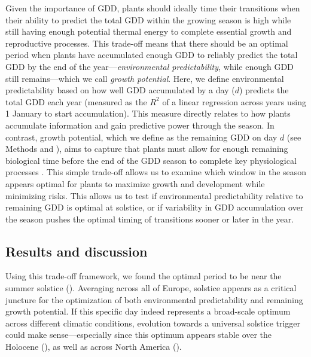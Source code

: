 \documentclass[11pt,letter]{article}
\begin{document}
Given the importance of GDD, plants should ideally time their transitions when their ability to predict the total GDD within the growing season is high while still having enough potential thermal energy to complete essential growth and reproductive processes. This trade-off means that there should be an optimal period when plants have accumulated enough GDD to reliably predict the total GDD by the end of the year---\emph{environmental predictability}, while enough GDD still remains---which we call \emph{growth potential}. Here, we define environmental predictability based on how well GDD accumulated by a day ($d$) predicts the total GDD each year (measured as the $R^2$ of a linear regression across years using 1 January to start accumulation). This measure directly relates to how plants accumulate information and gain predictive power through the season.
In contrast, growth potential, which we define as the remaining GDD on day $d$ (see Methods and ), aims to capture that plants must allow for enough remaining biological time before the end of the GDD season to complete key physiological processes \citep{Zohner2023, Journe2024}. This simple trade-off allows us to examine which window in the season appears optimal for plants to maximize growth and development while minimizing risks. This allows us to test if environmental predictability relative to remaining GDD is optimal at solstice, or if variability in GDD accumulation over the season pushes the optimal timing of transitions sooner or later in the year. 

\subsection*{Results and discussion}

Using this trade-off framework, we found the optimal period to be near the summer solstice (). Averaging across all of Europe, solstice appears as a critical juncture for the optimization of both environmental predictability and remaining growth potential.
If this specific day indeed represents a broad-scale optimum across different climatic conditions, evolution towards a universal solstice trigger could make sense---especially since this optimum appears stable over the Holocene (), as well as across North America ().
\end{document}
